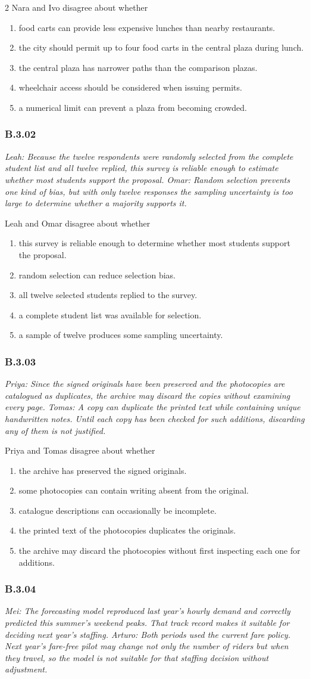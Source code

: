 \documentclass[10pt]{extarticle}
\newcommand{\choice}[1]{\item #1}
\newcommand{\bankitem}[1]{\subsubsection*{#1}}
\begin{document}
\begin{multicols}{2}
Nara and Ivo disagree about whether
\begin{enumerate}[label=(\alph*)]
  \choice{food carts can provide less expensive lunches than nearby restaurants.}
  \choice{the city should permit up to four food carts in the central plaza during lunch.}
  \choice{the central plaza has narrower paths than the comparison plazas.}
  \choice{wheelchair access should be considered when issuing permits.}
  \choice{a numerical limit can prevent a plaza from becoming crowded.}
\end{enumerate}
\bankitem{B.3.02}
\emph{Leah: Because the twelve respondents were randomly selected from the complete student list and all twelve replied, this survey is reliable enough to estimate whether most students support the proposal. Omar: Random selection prevents one kind of bias, but with only twelve responses the sampling uncertainty is too large to determine whether a majority supports it.}

Leah and Omar disagree about whether
\begin{enumerate}[label=(\alph*)]
  \choice{this survey is reliable enough to determine whether most students support the proposal.}
  \choice{random selection can reduce selection bias.}
  \choice{all twelve selected students replied to the survey.}
  \choice{a complete student list was available for selection.}
  \choice{a sample of twelve produces some sampling uncertainty.}
\end{enumerate}
\bankitem{B.3.03}
\emph{Priya: Since the signed originals have been preserved and the photocopies are catalogued as duplicates, the archive may discard the copies without examining every page. Tomas: A copy can duplicate the printed text while containing unique handwritten notes. Until each copy has been checked for such additions, discarding any of them is not justified.}

Priya and Tomas disagree about whether
\begin{enumerate}[label=(\alph*)]
  \choice{the archive has preserved the signed originals.}
  \choice{some photocopies can contain writing absent from the original.}
  \choice{catalogue descriptions can occasionally be incomplete.}
  \choice{the printed text of the photocopies duplicates the originals.}
  \choice{the archive may discard the photocopies without first inspecting each one for additions.}
\end{enumerate}
\bankitem{B.3.04}
\emph{Mei: The forecasting model reproduced last year's hourly demand and correctly predicted this summer's weekend peaks. That track record makes it suitable for deciding next year's staffing. Arturo: Both periods used the current fare policy. Next year's fare-free pilot may change not only the number of riders but when they travel, so the model is not suitable for that staffing decision without adjustment.}


\end{multicols}
\end{document}
